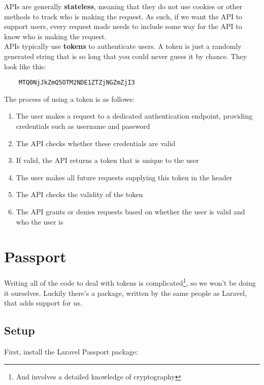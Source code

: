 APIs are generally \textbf{stateless}, meaning that they do not use cookies or other methods to track who is making the request. As such, if we want the API to support users, every request made needs to include some way for the API to know who is making the request.
\\

APIs typically use \textbf{tokens} to authenticate users. A token is just a randomly generated string that is so long that you could never guess it by chance. They look like this:

\begin{verbatim}
    MTQ0NjJkZmQ5OTM2NDE1ZTZjNGZmZjI3
\end{verbatim}

The process of using a token is as follows:

\begin{enumerate}
    \item The user makes a request to a dedicated authentication endpoint, providing credentials such as username and password
    \item The API checks whether these credentials are valid
    \item If valid, the API returns a token that is unique to the user
    \item The user makes all future requests supplying this token in the header
    \item The API checks the validity of the token
    \item The API grants or denies requests based on whether the user is valid and who the user is
\end{enumerate}

\pagebreak

\section{Passport}

Writing all of the code to deal with tokens is complicated\footnote{And involves a detailed knowledge of cryptography}, so we won't be doing it ourselves. Luckily there's a package, written by the same people as Laravel, that adds support for us.


\subsection{Setup}

First, install the Laravel Passport package:

